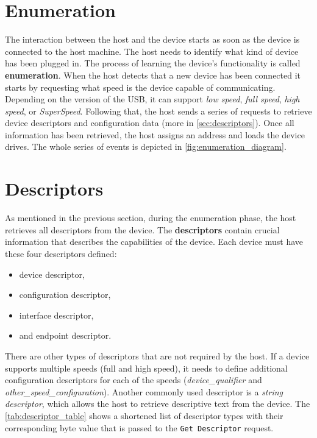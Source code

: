 \section{Enumeration}
\label{sec:enumeration}
The interaction between the host and the device starts as soon as the device is connected to the host machine. The host needs to identify what kind of device has been plugged in. The process of learning the device's functionality is called \textbf{enumeration}. When the host detects that a new device has been connected it starts by requesting what speed is the device capable of communicating. Depending on the version of the USB, it can support \emph{low speed}, \emph{full speed}, \emph{high speed}, or \emph{SuperSpeed}. Following that, the host sends a series of requests to retrieve device descriptors and configuration data (more in \autoref{sec:descriptors}). Once all information has been retrieved, the host assigns an address and loads the device drives. The whole series of events is depicted in \autoref{fig:enumeration_diagram}.

\section{Descriptors}
\label{sec:descriptors}

As mentioned in the previous section, during the enumeration phase, the host retrieves all descriptors from the device. The \textbf{descriptors} contain crucial information that describes the capabilities of the device. Each device must have these four descriptors defined:
\begin{itemize}
    \item device descriptor,
    \item configuration descriptor,
    \item interface descriptor,
    \item and endpoint descriptor.
\end{itemize}

There are other types of descriptors that are not required by the host. If a device supports multiple speeds (full and high speed), it needs to define additional configuration descriptors for each of the speeds (\emph{device\_qualifier} and \emph{other\_speed\_configuration}). Another commonly used descriptor is a \emph{string descriptor}, which allows the host to retrieve descriptive text from the device. The \autoref{tab:descriptor_table} shows a shortened list of descriptor types with their corresponding byte value that is passed to the \verb|Get Descriptor| request.


